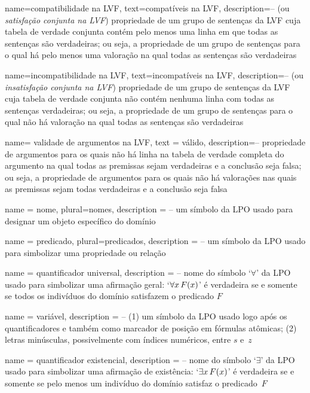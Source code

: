 {
 name=compatibilidade na LVF,
 text=compatíveis na LVF,
 description={-- (ou \textit{satisfação conjunta na LVF}) propriedade de um grupo de sentenças da LVF cuja tabela de verdade conjunta contém pelo menos uma linha em que todas as sentenças são verdadeiras; ou seja, a propriedade de um grupo de sentenças para o qual há pelo menos uma valoração na qual todas as sentenças são verdadeiras}
}

{
 name=incompatibilidade na LVF,
 text=incompatíveis na LVF,
 description={-- (ou \textit{insatisfação conjunta na LVF}) propriedade de um grupo de sentenças da LVF cuja tabela de verdade conjunta não contém nenhuma linha com todas as sentenças verdadeiras; ou seja, a propriedade de um grupo de sentenças para o qual não há valoração na qual todas as sentenças são verdadeiras}
}

{
 name= validade de argumentos na LVF,
 text = válido,
 description={-- propriedade de argumentos para os quais não há linha na tabela de verdade completa do argumento na qual todas as premissas sejam verdadeiras e a conclusão seja falsa; ou seja, a propriedade de argumentos para os quais não há valorações nas quais as premissas sejam todas verdadeiras e a conclusão seja falsa}
}

{
 name = nome,
 plural=nomes,
 description = {-- um símbolo da LPO usado para designar um objeto específico do domínio}
}

{
 name = predicado,
 plural=predicados,
 description = {-- um símbolo da LPO usado para simbolizar uma propriedade ou relação}
}

{
 name = quantificador universal,
 description = {-- nome do símbolo `$\forall$' da LPO usado para simbolizar uma afirmação geral: `$\forall x\, \mathord{F}(x)$' é verdadeira se e somente se todos os indivíduos do domínio satisfazem o predicado $F$}
}

{
 name = variável,
 description = {-- (1) um símbolo da LPO usado logo após os quantificadores e também como marcador de posição em fórmulas atômicas; (2) letras minúsculas, possivelmente com índices numéricos, entre $s$ e~$z$}
}

{
 name = quantificador existencial,
 description = {-- nome do símbolo `$\exists$' da LPO usado para simbolizar uma afirmação de existência: `$\exists x\, \mathord{F}(x)$' é verdadeira se e somente se pelo menos um indivíduo do domínio satisfaz o predicado~$F$}
}

